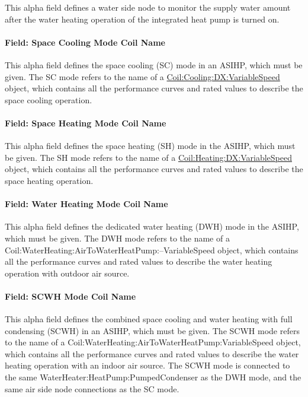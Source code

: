 This alpha field defines a water side node to monitor the supply water amount after the water heating operation of the integrated heat pump is turned on.

\paragraph{Field: Space Cooling Mode Coil Name}\label{Field-Space-Cooling-Mode-Coil-Name-ASIHP}

This alpha field defines the space cooling (SC) mode in an ASIHP, which must be given. The SC mode refers to the name of a \hyperref[coilcoolingdxvariablespeed]{Coil:Cooling:DX:VariableSpeed} object, which contains all the performance curves and rated values to describe the space cooling operation.

\paragraph{Field: Space Heating Mode Coil Name}\label{Field-Space-Heating-Mode-Coil-Name-ASIHP}

This alpha field defines the space heating (SH) mode in the ASIHP, which must be given. The SH mode refers to the name of a \hyperref[coilheatingdxvariablespeed]{Coil:Heating:DX:VariableSpeed} object, which contains all the performance curves and rated values to describe the space heating operation.

\paragraph{Field: Water Heating Mode Coil Name}\label{Field-Water-Heating-Mode-Coil-Name-ASIHP}

This alpha field defines the dedicated water heating (DWH) mode in the ASIHP, which must be given. The DWH mode refers to the name of a Coil:WaterHeating:AirToWaterHeatPump:--VariableSpeed object, which contains all the performance curves and rated values to describe the water heating operation with outdoor air source.

\paragraph{Field: SCWH Mode Coil Name}\label{Field-SCWH-Mode-Coil-Name-ASIHP}

This alpha field defines the combined space cooling and water heating with full condensing (SCWH) in an ASIHP, which must be given. The SCWH mode refers to the name of a Coil:WaterHeating:AirToWaterHeatPump:VariableSpeed object, which contains all the performance curves and rated values to describe the water heating operation with an indoor air source. The SCWH mode is connected to the same WaterHeater:HeatPump:PumpedCondenser as the DWH mode, and the same air side node connections as the SC mode.

